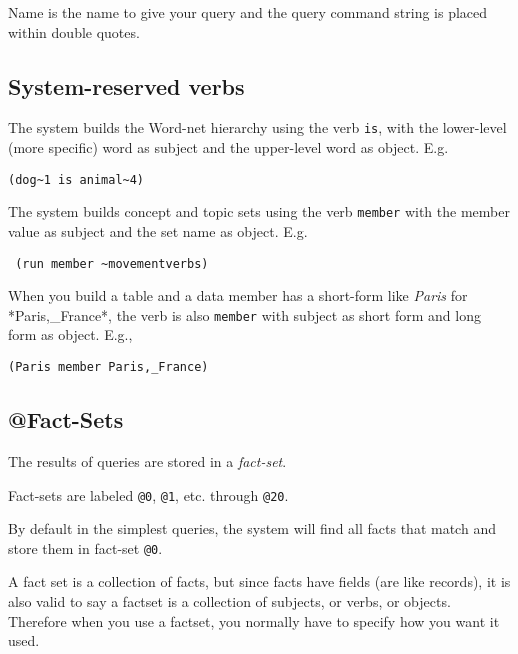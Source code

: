 \documentclass[]{article}
\begin{document}
Name is the name to give your query and the query command string is
placed within double quotes.

\subsection{System-reserved verbs}\label{system-reserved-verbs}

The system builds the Word-net hierarchy using the verb \texttt{is},
with the lower-level (more specific) word as subject and the upper-level
word as object. E.g.

\begin{verbatim}
(dog~1 is animal~4)
\end{verbatim}

The system builds concept and topic sets using the verb \texttt{member}
with the member value as subject and the set name as object. E.g.

\begin{verbatim}
 (run member ~movementverbs)
\end{verbatim}

When you build a table and a data member has a short-form like
\emph{Paris} for *Paris,\_France*, the verb is also \texttt{member} with
subject as short form and long form as object. E.g.,

\begin{verbatim}
(Paris member Paris,_France)
\end{verbatim}

\subsection{@Fact-Sets}\label{fact-sets}

The results of queries are stored in a \emph{fact-set}.

Fact-sets are labeled \texttt{@0}, \texttt{@1}, etc. through
\texttt{@20}.

By default in the simplest queries, the system will find all facts that
match and store them in fact-set \texttt{@0}.

A fact set is a collection of facts, but since facts have fields (are
like records), it is also valid to say a factset is a collection of
subjects, or verbs, or objects. Therefore when you use a factset, you
normally have to specify how you want it used.
\end{document}
